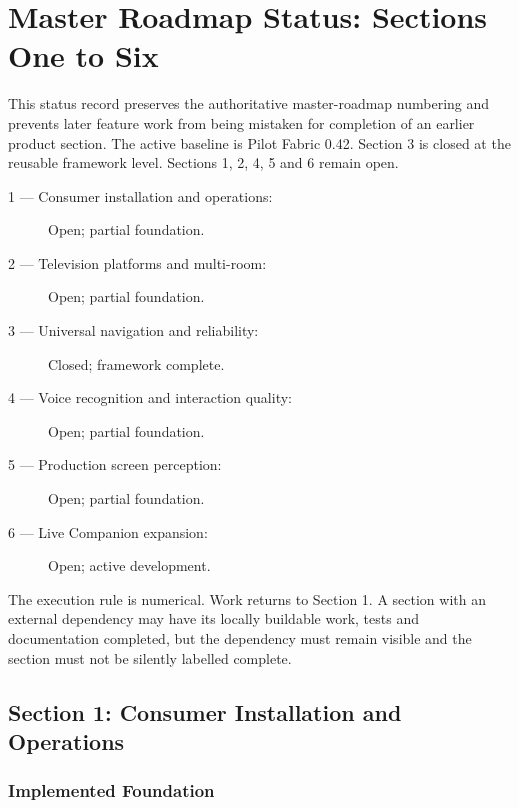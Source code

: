 
\section{Master Roadmap Status: Sections One to Six}
\label{sec:master-roadmap-one-to-six}

This status record preserves the authoritative master-roadmap numbering and prevents
later feature work from being mistaken for completion of an earlier product section.
The active baseline is Pilot Fabric 0.42. Section 3 is closed at the reusable
framework level. Sections 1, 2, 4, 5 and 6 remain open.

\begin{description}
  \item[1 --- Consumer installation and operations:] Open; partial foundation.
  \item[2 --- Television platforms and multi-room:] Open; partial foundation.
  \item[3 --- Universal navigation and reliability:] Closed; framework complete.
  \item[4 --- Voice recognition and interaction quality:] Open; partial foundation.
  \item[5 --- Production screen perception:] Open; partial foundation.
  \item[6 --- Live Companion expansion:] Open; active development.
\end{description}

The execution rule is numerical. Work returns to Section 1. A section with an
external dependency may have its locally buildable work, tests and documentation
completed, but the dependency must remain visible and the section must not be
silently labelled complete.

\subsection{Section 1: Consumer Installation and Operations}

\subsubsection{Implemented Foundation}

